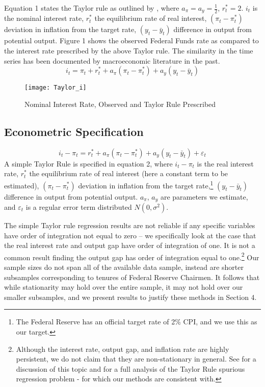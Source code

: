 \documentclass[notitlepage,12pt]{article}
\begin{document}
Equation 1 states the Taylor rule as outlined by \cite{taylor1993discretion}, where $a_{\pi }=a_{y} =\frac{1}{2}$, $r_{t}^{*}=2$.  $i_{t}$ is the nominal interest rate, $r_{t}^{*}$ the equilibrium rate of real interest, $(\pi _{t}-\pi _{t}^{*})$ deviation in inflation from the target rate, $(y_{t}-{\bar  y}_{t})$ difference in output from potential output.  Figure 1 shows the observed Federal Funds rate as compared to the interest rate prescribed by the above Taylor rule.  The similarity in the time series has been documented by macroeconomic literature in the past.\begin{equation}
i_{t}= \pi _{t} + r_{t}^{*} + a_{\pi }(\pi _{t} - \pi _{t}^{*})  + a_{y}(y_{t}-{\bar  y}_{t})  
\end{equation}
\begin{figure}[H]
\centering 
\caption{Nominal Interest Rate, Observed and Taylor Rule Prescribed}
\texttt{[image: Taylor\_i]}
\end{figure}

\subsection{Econometric Specification}
\begin{equation}
i_{t}-\pi _{t}=r_{t}^{*}+a_{\pi }(\pi _{t}-\pi _{t}^{*})+a_{y}(y_{t}-{\bar  y}_{t})+\varepsilon_t 
\end{equation}
A simple Taylor Rule is specified in equation 2, where $i_{t}-\pi _{t}$ is the real interest rate, $r_{t}^{*}$ the equilibrium rate of real interest (here a constant term to be estimated), $(\pi _{t}-\pi _{t}^{*})$ deviation in inflation from the target rate,\footnote{The Federal Reserve has an official target rate of 2\% CPI, and we use this as our target.} $(y_{t}-{\bar  y}_{t})$ difference in output from potential output.  $a_{\pi }$, $a_{y}$ are parameters we estimate, and $\varepsilon_t$ is a regular error term distributed $N(0,\sigma^2)$.


The simple Taylor rule regression results are not reliable if any specific variables have order of integration not equal to zero -- we specifically look at the case that the real interest rate and output gap have order of integration of one.  It is not a common result finding the output gap has order of integration equal to one.\footnote{Although the interest rate, output gap, and inflation rate are highly persistent, we do not claim that they are non-stationary in general.  See \cite{rudebusch1993uncertain} for a discussion of this topic and \cite{osterholm2005taylor} for a full analysis of the Taylor Rule spurious regression problem - for which our methods are consistent with.}  Our sample sizes do not span all of the available data sample, instead are shorter subsamples corresponding to tenures of Federal Reserve Chairmen.  It follows that while stationarity may hold over the entire sample, it may not hold over our smaller subsamples, and we present results to justify these methods in Section 4.
\end{document}
